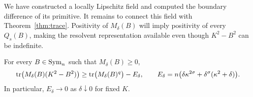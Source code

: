 We have constructed a locally Lipschitz field and computed the
boundary difference of its primitive.  It remains to connect this
field with Theorem~\ref{thm:trace}.  Positivity of $M_\delta(B)$
will imply positivity of every $Q_s(B)$, making the resolvent
representation available even though $K^2-B^2$ can be indefinite.

\begin{proposition}\label{prop:field-comparison}
For every $B\in\operatorname{Sym}_n$ such that $M_\delta(B)\geq0$,
\begin{equation}\label{eq:field-error}
 \operatorname{tr}\bigl(M_\delta(B)(K^2-B^2)\bigr)
       \geq\operatorname{tr}\bigl(M_\delta(B)^q\bigr)-E_\delta,
 \qquad
 E_\delta=n\bigl(\delta\kappa^{2\sigma}
                 +\delta^\sigma(\kappa^2+\delta)\bigr).
\end{equation}
In particular, $E_\delta\to0$ as $\delta\downarrow0$ for fixed $K$.
\end{proposition}

